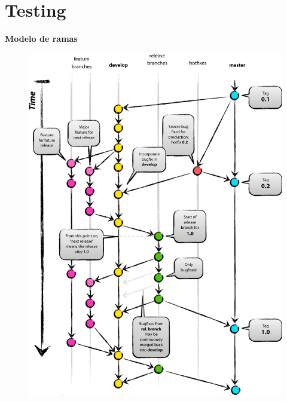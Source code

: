 \documentclass[11pt]{beamer}
\begin{document}
\section{Testing}

\begin{frame}{\textbf{\LARGE{Modelo de ramas}}}
	\vspace{-.7cm}
	\begin{figure}[H]
		{\includegraphics[height=.8\textheight]{./imagenes/Git-branching-model.pdf}}
	\end{figure}	
\end{frame}

\end{document}
